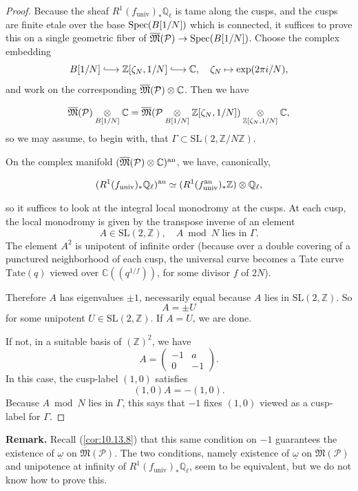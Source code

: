 \begin{proof}
Because the sheaf $R^1(f_{\mathrm{univ}})_* \mathbb{Q}_\ell$ is tame along the cusps, and the cusps are finite etale over the base $\operatorname{Spec}(B[1/N])$ which is connected, it suffices to prove this on a single geometric fiber of $\overline{\mathfrak{M}}(\mathcal{P}) \to \operatorname{Spec}(B[1/N])$. Choose the complex embedding
\[
B[1/N] \mathrel{\lhook\joinrel\longrightarrow} \mathbb{Z}[\zeta_N, 1/N] \mathrel{\lhook\joinrel\longrightarrow} \mathbb{C}, \quad \zeta_N \mapsto \exp(2\pi i/N) ,
\]
and work on the corresponding $\overline{\mathfrak{M}}(\mathcal{P}) \underset{}{\otimes} \mathbb{C}$. Then we have
\[
\overline{\mathfrak{M}}(\mathcal{P}) \underset{B[1/N]}{\otimes} \mathbb{C} = \overline{\mathfrak{M}}(\mathcal{P} \underset{B[1/N]}{\otimes} \mathbb{Z}[\zeta_N, 1/N]) \underset{\mathbb{Z}[\zeta_N, 1/N]}{\otimes} \mathbb{C} ,
\]
so we may assume, to begin with, that $\Gamma \subset \mathrm{SL}(2, \mathbb{Z}/N\mathbb{Z})$.

On the complex manifold $(\overline{\mathfrak{M}}(\mathcal{P}) \underset{}{\otimes} \mathbb{C})^{\mathrm{an}}$, we have, canonically,
\[
(R^1(f_{\mathrm{univ}})_* \mathbb{Q}_\ell)^{\mathrm{an}} \simeq (R^1(f_{\mathrm{univ}}^{\mathrm{an}})_* \mathbb{Z}) \underset{}{\otimes} \mathbb{Q}_\ell ,
\]
so it suffices to look at the integral local monodromy at the cusps. At each cusp, the local monodromy is given by the transpose inverse of an element
\[
A \in \mathrm{SL}(2, \mathbb{Z}), \quad A \bmod N \text{ lies in } \Gamma .
\]
The element $A^2$ is unipotent of infinite order (because over a double covering of a punctured neighborhood of each cusp, the universal curve becomes a Tate curve $\mathrm{Tate}(q)$ viewed over $\mathbb{C}((q^{1/f}))$, for some divisor $f$ of $2N$).

Therefore $A$ has eigenvalues $\pm 1$, necessarily equal because $A$ lies in $\mathrm{SL}(2, \mathbb{Z})$. So
\[
A = \pm U
\]
for some unipotent $U \in \mathrm{SL}(2, \mathbb{Z})$. If $A = U$, we are done.

If not, in a suitable basis of $(\mathbb{Z})^2$, we have
\[
A = \begin{pmatrix} -1 & a \\ 0 & -1 \end{pmatrix} .
\]
In this case, the cusp-label $(1,0)$ satisfies
\[
(1,0)A = -(1,0) .
\]
Because $A \bmod N$ lies in $\Gamma$, this says that $-1$ fixes $(1,0)$ viewed as a cusp-label for $\Gamma$.
\end{proof}

\noindent\textbf{Remark.} Recall (\ref{cor:10.13.8}) that this same condition on $-1$ guarantees the existence of $\underline{\omega}$ on $\overline{\mathfrak{M}}(\mathcal{P})$. The two conditions, namely existence of $\underline{\omega}$ on $\overline{\mathfrak{M}}(\mathcal{P})$ and unipotence at infinity of $R^1(f_{\mathrm{univ}})_* \mathbb{Q}_\ell$, seem to be equivalent, but we do not know how to prove this.

